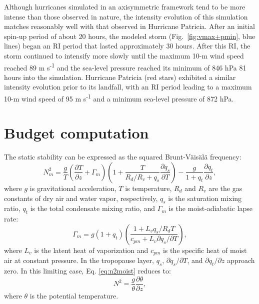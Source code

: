 Although hurricanes simulated in an axisymmetric framework tend to be more intense than those observed in nature, the intensity evolution of this simulation matches reasonably well with that observed in Hurricane Patricia.
After an initial spin-up period of about 20 hours, the modeled storm (Fig.~\ref{fig:vmax+pmin}, blue lines) began an RI period that lasted approximately 30 hours.
After this RI, the storm continued to intensify more slowly until the maximum 10-m wind speed reached 89 m s\textsuperscript{-1} and the sea-level pressure reached its minimum of 846 hPa 81 hours into the simulation.
Hurricane Patricia (red stars) exhibited a similar intensity evolution prior to its landfall, with an RI period leading to a maximum 10-m wind speed of 95 m s\textsuperscript{-1} and a minimum sea-level pressure of 872 hPa.

\section{Budget computation}
The static stability can be expressed as the squared Brunt-V{\"a}is{\"a}l{\"a} frequency:
   \begin{equation} \label{eq:n2moist}
   N_m^2 = \frac{g}{T}\left(\frac{\partial T}{\partial z}+\Gamma_m\right)\left(1+\frac{T}{R_d/R_v+q_s}\frac{\partial q_s}{\partial T}\right)-\frac{g}{1+q_t}\frac{\partial q_t}{\partial z},
   \end{equation}
where $g$ is gravitational acceleration, $T$ is temperature, $R_d$ and $R_v$ are the gas constants of dry air and water vapor, respectively, $q_s$ is the saturation mixing ratio, $q_t$ is the total condensate mixing ratio, and $\Gamma_m$ is the moist-adiabatic lapse rate:
   \begin{equation} \label{eq:gamma_m}
   \Gamma_m = g(1+q_t)\left(\frac{1+L_vq_s/R_dT}{c_{pm}+L_v\partial q_s/\partial T}\right),
   \end {equation}
where $L_v$ is the latent heat of vaporization and $c_{pm}$ is the specific heat of moist air at constant pressure.
In the tropopause layer, $q_s$, ${\partial q_s}/{\partial T}$, and ${\partial q_t}/{\partial z}$ approach zero. In this limiting case, Eq. \ref{eq:n2moist} reduces to:
   \begin{equation} \label{eq:n2dry}
   N^2 = \frac{g}{\theta}\frac{\partial \theta}{\partial z},
   \end{equation}
where $\theta$ is the potential temperature.

